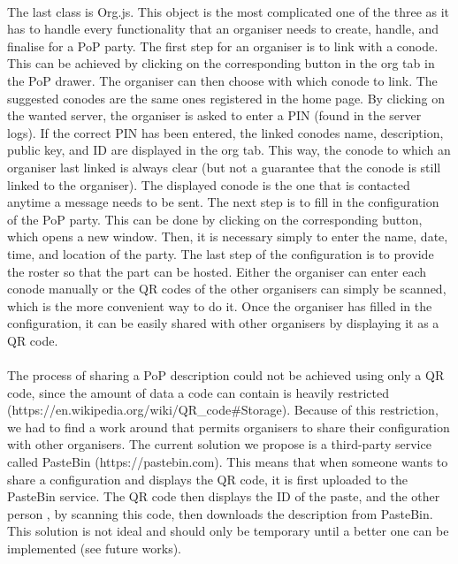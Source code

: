 \paragraph{}
The last class is Org.js. This object is the most complicated one of the three as it has to handle every functionality that an organiser needs to create, handle, and finalise for a PoP party. The first step for an organiser is to link with a conode. This can be achieved by clicking on the corresponding button in the org tab in the PoP drawer. The organiser can then choose with which conode to link. The suggested conodes are the same ones registered in the home page. By clicking on the wanted server, the organiser is asked to enter a PIN (found in the server logs). If the correct PIN has been entered, the linked conodes name, description, public key, and ID are displayed in the org tab. This way, the conode to which an organiser last linked is always clear (but not a guarantee that the conode is still linked to the organiser). The displayed conode is the one that is contacted anytime a message needs to be sent. The next step is to fill in the configuration of the PoP party. This can be done by clicking on the corresponding button, which opens a new window. Then, it is necessary simply to enter the name, date, time, and location of the party. The last step of the configuration is to provide the roster so that the part can be hosted. Either the organiser can enter each conode manually or the QR codes of the other organisers can simply be scanned, which is the more convenient way to do it. Once the organiser has filled in the configuration, it can be easily shared with other organisers by displaying it as a QR code.

\paragraph{}
The process of sharing a PoP description could not be achieved using only a QR code, since the amount of data a code can contain is heavily restricted (https://en.wikipedia.org/wiki/QR\_code\#Storage). Because of this restriction, we had to find a work around that permits organisers to share their configuration with other organisers. The current solution we propose is a third-party service called PasteBin (https://pastebin.com). This means that when someone wants to share a configuration and displays the QR code, it is first uploaded to the PasteBin service. The QR code then displays the ID of the paste, and the other person , by scanning this code, then downloads the description from PasteBin. This solution is not ideal and should only be temporary until a better one can be implemented (see future works).

